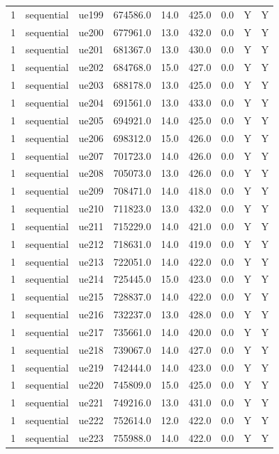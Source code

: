 \begin{table}[ht]
\begin{tabular}{|c|c|c|c|c|c|c|c|c|}
1 & sequential & ue199 & 674586.0 & 14.0 & 425.0 & 0.0 & Y & Y \\
1 & sequential & ue200 & 677961.0 & 13.0 & 432.0 & 0.0 & Y & Y \\
1 & sequential & ue201 & 681367.0 & 13.0 & 430.0 & 0.0 & Y & Y \\
1 & sequential & ue202 & 684768.0 & 15.0 & 427.0 & 0.0 & Y & Y \\
1 & sequential & ue203 & 688178.0 & 13.0 & 425.0 & 0.0 & Y & Y \\
1 & sequential & ue204 & 691561.0 & 13.0 & 433.0 & 0.0 & Y & Y \\
1 & sequential & ue205 & 694921.0 & 14.0 & 425.0 & 0.0 & Y & Y \\
1 & sequential & ue206 & 698312.0 & 15.0 & 426.0 & 0.0 & Y & Y \\
1 & sequential & ue207 & 701723.0 & 14.0 & 426.0 & 0.0 & Y & Y \\
1 & sequential & ue208 & 705073.0 & 13.0 & 426.0 & 0.0 & Y & Y \\
1 & sequential & ue209 & 708471.0 & 14.0 & 418.0 & 0.0 & Y & Y \\
1 & sequential & ue210 & 711823.0 & 13.0 & 432.0 & 0.0 & Y & Y \\
1 & sequential & ue211 & 715229.0 & 14.0 & 421.0 & 0.0 & Y & Y \\
1 & sequential & ue212 & 718631.0 & 14.0 & 419.0 & 0.0 & Y & Y \\
1 & sequential & ue213 & 722051.0 & 14.0 & 422.0 & 0.0 & Y & Y \\
1 & sequential & ue214 & 725445.0 & 15.0 & 423.0 & 0.0 & Y & Y \\
1 & sequential & ue215 & 728837.0 & 14.0 & 422.0 & 0.0 & Y & Y \\
1 & sequential & ue216 & 732237.0 & 13.0 & 428.0 & 0.0 & Y & Y \\
1 & sequential & ue217 & 735661.0 & 14.0 & 420.0 & 0.0 & Y & Y \\
1 & sequential & ue218 & 739067.0 & 14.0 & 427.0 & 0.0 & Y & Y \\
1 & sequential & ue219 & 742444.0 & 14.0 & 423.0 & 0.0 & Y & Y \\
1 & sequential & ue220 & 745809.0 & 15.0 & 425.0 & 0.0 & Y & Y \\
1 & sequential & ue221 & 749216.0 & 13.0 & 431.0 & 0.0 & Y & Y \\
1 & sequential & ue222 & 752614.0 & 12.0 & 422.0 & 0.0 & Y & Y \\
1 & sequential & ue223 & 755988.0 & 14.0 & 422.0 & 0.0 & Y & Y \\

\end{tabular}
\end{table}
